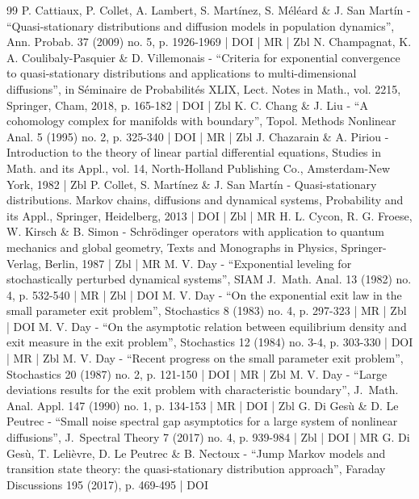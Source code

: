 \documentclass[10pt]{amsart}
\theoremstyle{plain}
\theoremstyle{definition}
\begin{document}
\begin{thebibliography}{99}
P. Cattiaux, P. Collet, A. Lambert, S. Martínez, S. Méléard \& J. San Martín - “Quasi-stationary distributions and diffusion models in population dynamics”, Ann. Probab. 37 (2009) no. 5, p. 1926-1969 | DOI | MR | Zbl
N. Champagnat, K. A. Coulibaly-Pasquier \& D. Villemonais - “Criteria for exponential convergence to quasi-stationary distributions and applications to multi-dimensional diffusions”, in Séminaire de Probabilités XLIX, Lect. Notes in Math., vol. 2215, Springer, Cham, 2018, p. 165-182 | DOI | Zbl
K. C. Chang \& J. Liu - “A cohomology complex for manifolds with boundary”, Topol. Methods Nonlinear Anal. 5 (1995) no. 2, p. 325-340 | DOI | MR | Zbl
J. Chazarain \& A. Piriou - Introduction to the theory of linear partial differential equations, Studies in Math. and its Appl., vol. 14, North-Holland Publishing Co., Amsterdam-New York, 1982 | Zbl
P. Collet, S. Martínez \& J. San Martín - Quasi-stationary distributions. Markov chains, diffusions and dynamical systems, Probability and its Appl., Springer, Heidelberg, 2013 | DOI | Zbl | MR
H. L. Cycon, R. G. Froese, W. Kirsch \& B. Simon - Schrödinger operators with application to quantum mechanics and global geometry, Texts and Monographs in Physics, Springer-Verlag, Berlin, 1987 | Zbl | MR
M. V. Day - “Exponential leveling for stochastically perturbed dynamical systems”, SIAM J. Math. Anal. 13 (1982) no. 4, p. 532-540 | MR | Zbl | DOI
M. V. Day - “On the exponential exit law in the small parameter exit problem”, Stochastics 8 (1983) no. 4, p. 297-323 | MR | Zbl | DOI
M. V. Day - “On the asymptotic relation between equilibrium density and exit measure in the exit problem”, Stochastics 12 (1984) no. 3-4, p. 303-330 | DOI | MR | Zbl
M. V. Day - “Recent progress on the small parameter exit problem”, Stochastics 20 (1987) no. 2, p. 121-150 | DOI | MR | Zbl
M. V. Day - “Large deviations results for the exit problem with characteristic boundary”, J. Math. Anal. Appl. 147 (1990) no. 1, p. 134-153 | MR | DOI | Zbl
G. Di Gesù \& D. Le Peutrec - “Small noise spectral gap asymptotics for a large system of nonlinear diffusions”, J. Spectral Theory 7 (2017) no. 4, p. 939-984 | Zbl | DOI | MR
G. Di Gesù, T. Lelièvre, D. Le Peutrec \& B. Nectoux - “Jump Markov models and transition state theory: the quasi-stationary distribution approach”, Faraday Discussions 195 (2017), p. 469-495 | DOI

\end{thebibliography}
\end{document}
